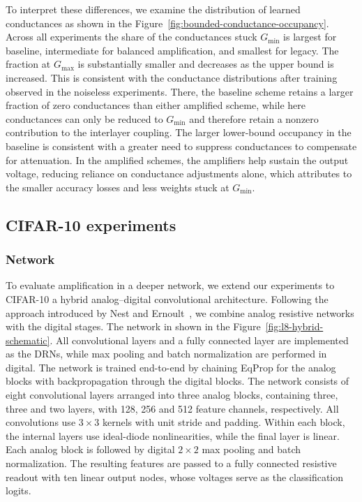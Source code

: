 \documentclass{article}
\begin{document}
To interpret these differences, we examine the distribution of learned
conductances as shown in the Figure~\ref{fig:bounded-conductance-occupancy}. Across all experiments the share of the conductances stuck $G_{\min}$ is largest for
baseline, intermediate for balanced amplification, and smallest for
legacy. The fraction at $G_{\max}$ is
substantially smaller and decreases as the upper bound is increased.
This is consistent with the conductance distributions after training observed in
the noiseless experiments. There, the baseline scheme retains a
larger fraction of zero conductances than either amplified scheme, while here conductances can only
be reduced to $G_{\min}$ and therefore retain a nonzero contribution
to the interlayer coupling. The larger lower-bound occupancy in the
baseline is consistent with a greater need to suppress conductances
to compensate for attenuation. In the amplified schemes, the
amplifiers help sustain the output voltage, reducing reliance on
conductance adjustments alone, which attributes to the smaller accuracy losses and
less weights stuck at $G_{\min}$.


\clearpage

\subsection{CIFAR-10 experiments}
\label{sec:cifar10_results}

\subsubsection{Network}
\label{sec:cifar10_network}

To evaluate amplification in a deeper network, we extend our experiments
to CIFAR-10 a hybrid analog--digital convolutional architecture.
Following the approach introduced by Nest and Ernoult~\cite{nest2024hybrid},
we combine analog resistive networks with the digital stages. The network in shown in the Figure~\ref{fig:l8-hybrid-schematic}. 
All convolutional layers and a fully connected layer are implemented as the DRNs,
while max pooling and batch normalization are performed in digital.
The network is trained end-to-end by chaining EqProp for the analog blocks with backpropagation through the
digital blocks.
The network consists of eight convolutional layers arranged into three analog
blocks, containing three, three and two layers, with 128, 256 and 512 feature channels, respectively. All convolutions use
$3\times3$ kernels with unit stride and padding. Within each block,
the internal layers use ideal-diode nonlinearities, while the final
layer is linear. Each analog block is followed by digital $2\times2$ max
pooling and batch normalization. The resulting
features are passed to a fully connected resistive readout with ten
linear output nodes, whose voltages serve as the classification logits.
\end{document}
